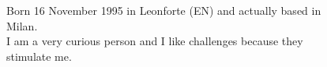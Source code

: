 \documentclass[9pt]{developercv} %
\begin{document}
\vspace{0.5cm}



\begin{figure}[!htb]
	\centering
	\begin{minipage}{0.5\textwidth} %
		\vspace{0.3cm}
		\vspace{-\baselineskip} %

		Born 16 November 1995 in Leonforte (EN) and actually based in Milan.\\
		I am a very curious person and I like challenges because they stimulate me.\\


	\end{minipage}
	\hfill %
	\begin{minipage}{0.4\textwidth} %
		\centering
	\end{minipage}
\end{figure}

\vspace{0.5cm}

\end{document}
